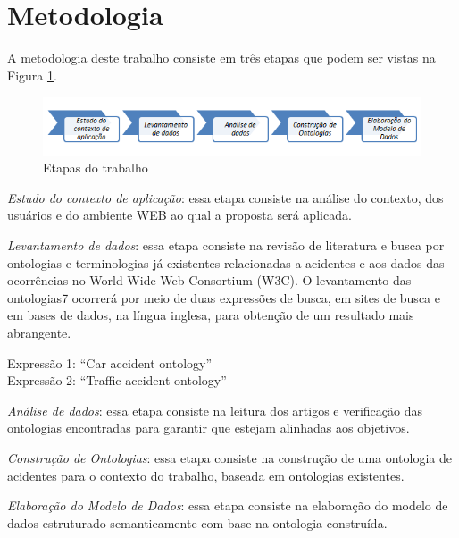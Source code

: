 \section{Metodologia}

A metodologia deste trabalho consiste em três etapas que podem ser vistas na
Figura \ref{fig:metodologia}.

\graphicspath{{figuras/}}

\begin{figure}[!htb]
 \centering
 \includegraphics[scale = 0.5]{metodologia}
 \caption{Etapas do trabalho}
 \label{fig:metodologia}

\end{figure}
\textit{Estudo do contexto de aplicação}: essa etapa consiste na análise do contexto, dos
usuários e do ambiente WEB ao qual a proposta será aplicada.

\textit{Levantamento de dados}: essa etapa consiste na revisão de literatura e busca por
ontologias e terminologias já existentes relacionadas a acidentes e aos dados das
ocorrências no World Wide Web Consortium (W3C). O levantamento das ontologias7
ocorrerá por meio de duas expressões de busca, em sites de busca e em bases de dados, na
língua inglesa, para obtenção de um resultado mais abrangente.

\begin{center}
  Expressão 1: “Car accident ontology”\\
  Expressão 2: “Traffic accident ontology”
\end{center}


\textit{Análise de dados}: essa etapa consiste na leitura dos artigos e verificação das
ontologias encontradas para garantir que estejam alinhadas aos objetivos.

\textit{Construção de Ontologias}: essa etapa consiste na construção de uma ontologia de
acidentes para o contexto do trabalho, baseada em ontologias existentes.

\textit{Elaboração do Modelo de Dados}: essa etapa consiste na elaboração do modelo de
dados estruturado semanticamente com base na ontologia construída.